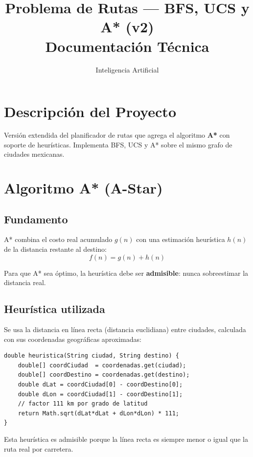 \documentclass[12pt,a4paper]{article}
\title{\textbf{Problema de Rutas --- BFS, UCS y A* (v2)}\\
  \large Documentación Técnica}
\author{Inteligencia Artificial}
\date{}
\begin{document}
\maketitle
\tableofcontents
\newpage

\section{Descripción del Proyecto}
Versión extendida del planificador de rutas que agrega el algoritmo \textbf{A*} con soporte de heurísticas. Implementa BFS, UCS y A* sobre el mismo grafo de ciudades mexicanas.

\section{Algoritmo A* (A-Star)}

\subsection{Fundamento}
A* combina el costo real acumulado $g(n)$ con una estimación heurística $h(n)$ de la distancia restante al destino:
\[
f(n) = g(n) + h(n)
\]

Para que A* sea óptimo, la heurística debe ser \textbf{admisible}: nunca sobreestimar la distancia real.

\subsection{Heurística utilizada}
Se usa la distancia en línea recta (distancia euclidiana) entre ciudades, calculada con sus coordenadas geográficas aproximadas:

\begin{lstlisting}
double heuristica(String ciudad, String destino) {
    double[] coordCiudad  = coordenadas.get(ciudad);
    double[] coordDestino = coordenadas.get(destino);
    double dLat = coordCiudad[0] - coordDestino[0];
    double dLon = coordCiudad[1] - coordDestino[1];
    // factor 111 km por grado de latitud
    return Math.sqrt(dLat*dLat + dLon*dLon) * 111;
}
\end{lstlisting}

Esta heurística es admisible porque la línea recta es siempre menor o igual que la ruta real por carretera.
\end{document}
